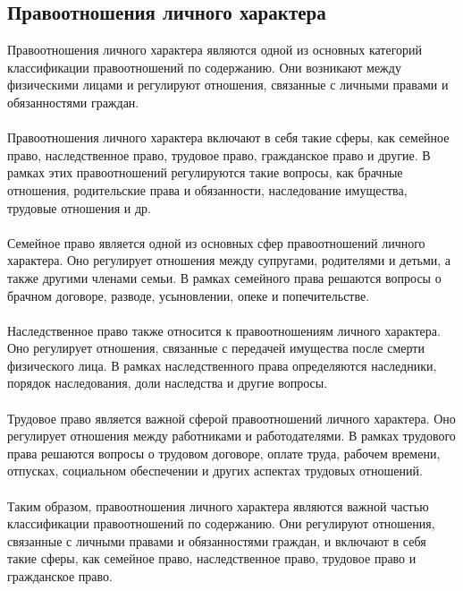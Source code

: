 \documentclass{article}
\begin{document}
\subsection{Правоотношения личного характера}
Правоотношения личного характера являются одной из основных категорий классификации правоотношений по содержанию. Они возникают между физическими лицами и регулируют отношения, связанные с личными правами и обязанностями граждан.\\
~\\
Правоотношения личного характера включают в себя такие сферы, как семейное право, наследственное право, трудовое право, гражданское право и другие. В рамках этих правоотношений регулируются такие вопросы, как брачные отношения, родительские права и обязанности, наследование имущества, трудовые отношения и др.\\
~\\
Семейное право является одной из основных сфер правоотношений личного характера. Оно регулирует отношения между супругами, родителями и детьми, а также другими членами семьи. В рамках семейного права решаются вопросы о брачном договоре, разводе, усыновлении, опеке и попечительстве.\\
~\\
Наследственное право также относится к правоотношениям личного характера. Оно регулирует отношения, связанные с передачей имущества после смерти физического лица. В рамках наследственного права определяются наследники, порядок наследования, доли наследства и другие вопросы.\\
~\\
Трудовое право является важной сферой правоотношений личного характера. Оно регулирует отношения между работниками и работодателями. В рамках трудового права решаются вопросы о трудовом договоре, оплате труда, рабочем времени, отпусках, социальном обеспечении и других аспектах трудовых отношений.\\
~\\
Таким образом, правоотношения личного характера являются важной частью классификации правоотношений по содержанию. Они регулируют отношения, связанные с личными правами и обязанностями граждан, и включают в себя такие сферы, как семейное право, наследственное право, трудовое право и гражданское право.\\
~\\

\newpage
\end{document}

